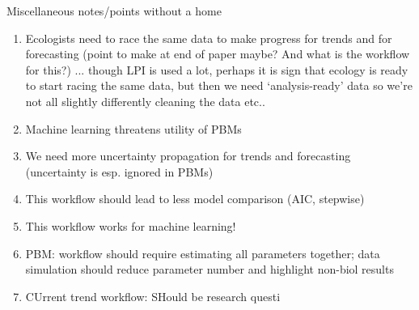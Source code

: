 \documentclass[11pt]{article}
\begin{document}
Miscellaneous notes/points without a home
\begin{enumerate}
\item Ecologists need to race the same data to make progress for trends and for forecasting (point to make at end of paper maybe? And what is the workflow for this?) ... though LPI is used a lot, perhaps it is  sign that ecology is ready to start racing the same data, but then we need `analysis-ready' data so we're not all slightly differently cleaning the data etc..
\item Machine learning threatens utility of PBMs
\item We need more uncertainty propagation for trends and forecasting (uncertainty is esp. ignored in PBMs)
\item This workflow should lead to less model comparison (AIC, stepwise)
\item This workflow works for machine learning!
\item PBM: workflow should require estimating all parameters together; data simulation should reduce parameter number and highlight non-biol results
\item CUrrent trend workflow: SHould be research questi
\end{enumerate}
\end{document}
